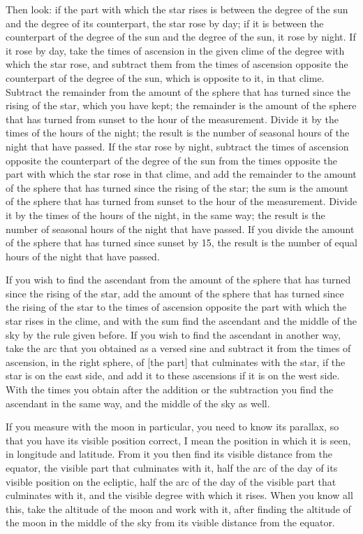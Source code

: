 \documentclass[11pt]{article}
\newcommand{\ArPage}[1]{\marginpar{\footnotesize\color{gray}Ar.\,p.\,#1}}
\begin{document}
\par Then look: if the part with which the star rises is between the degree of the sun and the degree of its counterpart, the star rose by day; if it is between the counterpart of the degree of the sun and the degree of the sun, it rose by night. If it rose by day, take the times of ascension in the given clime of the degree with which the star rose, and subtract them from the times of ascension opposite the counterpart of the degree of the sun, which is opposite to it, in that clime. Subtract the remainder from the amount of the sphere that has turned since the rising of the star, which you have kept; the remainder is the amount of the sphere that has turned from sunset to the hour of the measurement. Divide it by the times of the hours of the night; the result is the number of seasonal hours of the night that have passed. If the star rose by night, subtract the times of ascension opposite the counterpart of the degree of the sun from the times opposite the part with which the star rose in that clime, and add the remainder to the amount of the sphere that has turned since the rising of the star; the sum is the amount of the sphere that has turned from sunset to the hour of the measurement. Divide it by the times of the hours of the night, in the same way; the result is the number of seasonal hours of the night that have passed. If you divide the amount of the sphere that has turned since sunset by 15, the result is the number of equal hours of the night that have passed.\par
\par \ArPage{52}If you wish to find the ascendant from the amount of the sphere that has turned since the rising of the star, add the amount of the sphere that has turned since the rising of the star to the times of ascension opposite the part with which the star rises in the clime, and with the sum find the ascendant and the middle of the sky by the rule given before. If you wish to find the ascendant in another way, take the arc that you obtained as a versed sine and subtract it from the times of ascension, in the right sphere, of [the part] that culminates with the star, if the star is on the east side, and add it to these ascensions if it is on the west side. With the times you obtain after the addition or the subtraction you find the ascendant in the same way, and the middle of the sky as well.\par
\par If you measure with the moon in particular, you need to know its parallax, so that you have its visible position correct, I mean the position in which it is seen, in longitude and latitude. From it you then find its visible distance from the equator, the visible part that culminates with it, half the arc of the day of its visible position on the ecliptic, half the arc of the day of the visible part that culminates with it, and the visible degree with which it rises. When you know all this, take the altitude of the moon and work with it, after finding the altitude of the moon in the middle of the sky from its visible distance from the equator.\par
\end{document}
